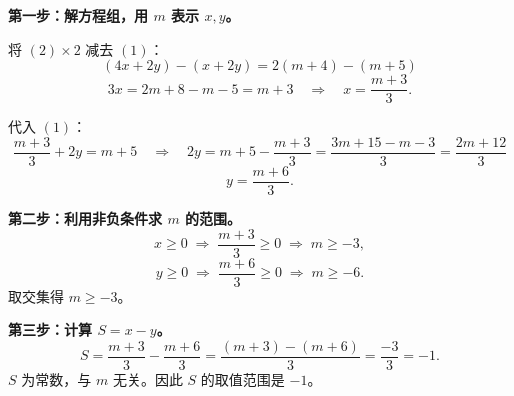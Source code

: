 \textbf{第一步：解方程组，用 \(m\) 表示 \(x, y\)。}

将 \((2) \times 2\) 减去 \((1)\)：
\[
(4x + 2y) - (x + 2y) = 2(m+4) - (m+5)
\]
\[
3x = 2m + 8 - m - 5 = m + 3 \quad\Rightarrow\quad x = \frac{m+3}{3}.
\]

代入 \((1)\)：
\[
\frac{m+3}{3} + 2y = m + 5 \quad\Rightarrow\quad 2y = m + 5 - \frac{m+3}{3} = \frac{3m+15 - m - 3}{3} = \frac{2m+12}{3}
\]
\[
y = \frac{m+6}{3}.
\]

\textbf{第二步：利用非负条件求 \(m\) 的范围。}
\[
x \geq 0 \;\Rightarrow\; \frac{m+3}{3} \geq 0 \;\Rightarrow\; m \geq -3,
\]
\[
y \geq 0 \;\Rightarrow\; \frac{m+6}{3} \geq 0 \;\Rightarrow\; m \geq -6.
\]
取交集得 \(m \geq -3\)。

\textbf{第三步：计算 \(S = x - y\)。}
\[
S = \frac{m+3}{3} - \frac{m+6}{3} = \frac{(m+3)-(m+6)}{3} = \frac{-3}{3} = -1.
\]
\(S\) 为常数，与 \(m\) 无关。因此 \(S\) 的取值范围是 \(\boxed{-1}\)。


